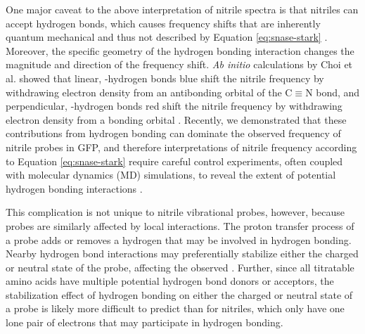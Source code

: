 One major caveat to the above interpretation of nitrile spectra is that nitriles can accept hydrogen bonds, which causes frequency shifts that are inherently quantum mechanical and thus not described by Equation \ref{eq:snase-stark} \cite{Slocum2018}. 
Moreover, the specific geometry of the hydrogen bonding interaction changes the magnitude and direction of the frequency shift. 
\emph{Ab initio} calculations by Choi et al. showed that linear, \textsigma-hydrogen bonds blue shift the nitrile frequency by withdrawing electron density from an antibonding orbital of the C$\equiv$N bond, and perpendicular, \textpi-hydrogen bonds red shift the nitrile frequency by withdrawing electron density from a bonding orbital \cite{Choi2008}. 
Recently, we demonstrated that these contributions from hydrogen bonding can dominate the observed frequency of nitrile probes in GFP, and therefore interpretations of nitrile frequency according to Equation \ref{eq:snase-stark} require careful control experiments, often coupled with molecular dynamics (MD) simulations, to reveal the extent of potential hydrogen bonding interactions \cite{First2018}. 

This complication is not unique to nitrile vibrational probes, however, because \pKa{} probes are similarly affected by local interactions. 
The proton transfer process of a \pKa{} probe adds or removes a hydrogen that may be involved in hydrogen bonding. 
Nearby hydrogen bond interactions may preferentially stabilize either the charged or neutral state of the probe, affecting the observed \dpKa{}. 
Further, since all titratable amino acids have multiple potential hydrogen bond donors or acceptors, the stabilization effect of hydrogen bonding on either the charged or neutral state of a \pKa{} probe is likely more difficult to predict than for nitriles, which only have one lone pair of electrons that may participate in hydrogen bonding. 

